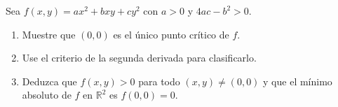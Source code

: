 Sea $f(x, y) = ax^2 + bxy + cy^2$ con $a > 0$ y $4ac - b^2 > 0$.
\begin{enumerate}
    \item Muestre que $(0, 0)$ es el único punto crítico de $f$.
    \item Use el criterio de la segunda derivada para clasificarlo.
    \item Deduzca que $f(x, y) > 0$ para todo $(x, y) \neq (0, 0)$ y que el mínimo absoluto de $f$ en $\mathbb{R}^2$ es $f(0, 0) = 0$.
\end{enumerate}
